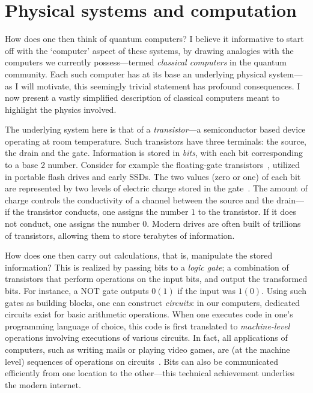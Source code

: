 \documentclass[main.tex]{subfiles}
\begin{document}
\section{Physical systems and computation}\label{sec:phys_syst}
How does one then think of quantum computers? I believe it informative to start off with the `computer' aspect of these systems, by drawing analogies with the computers we currently possess---termed \emph{classical computers} in the quantum community. Each such computer has at its base an underlying physical system---as I will motivate, this seemingly trivial statement has profound consequences. I now present a vastly simplified description of classical computers meant to highlight the physics involved.  

The underlying system here is that of a \emph{transistor}---a semiconductor based device operating at room temperature. Such transistors have three terminals: the source, the drain and the gate. Information is stored in \emph{bits}, with each bit corresponding to a base 2 number. Consider for example the floating-gate transistors~\cite{hasler2016scaling, kahng1967floating}, utilized in portable flash drives and early SSDs. The two values (zero or one) of each bit are represented by two levels of electric charge stored in the gate~\cite{hasler2001overview}. The amount of charge controls the conductivity of a channel between the source and the drain---if the transistor conducts, one assigns the number $1$ to the transistor. If it does not conduct, one assigns the number $0$. Modern drives are often built of trillions of transistors, allowing them to store terabytes of information. 

How does one then carry out calculations, that is, manipulate the stored information? This is realized by passing bits to a \emph{logic gate}; a combination of transistors that perform operations on the input bits, and output the transformed bits. For instance, a $\mathrm{NOT}$ gate outputs $0(1)$ if the input was $1(0)$. Using such gates as building blocks, one can construct \emph{circuits}: in our computers, dedicated circuits exist for basic arithmetic operations. When one executes code in one's programming language of choice, this code is first translated to \emph{machine-level} operations involving executions of various circuits. In fact, all applications of computers, such as writing mails or playing video games, are (at the machine level) sequences of operations on circuits~\cite{patterson2016}. Bits can also be communicated efficiently from one location to the other---this technical achievement underlies the modern internet. 
\end{document}
